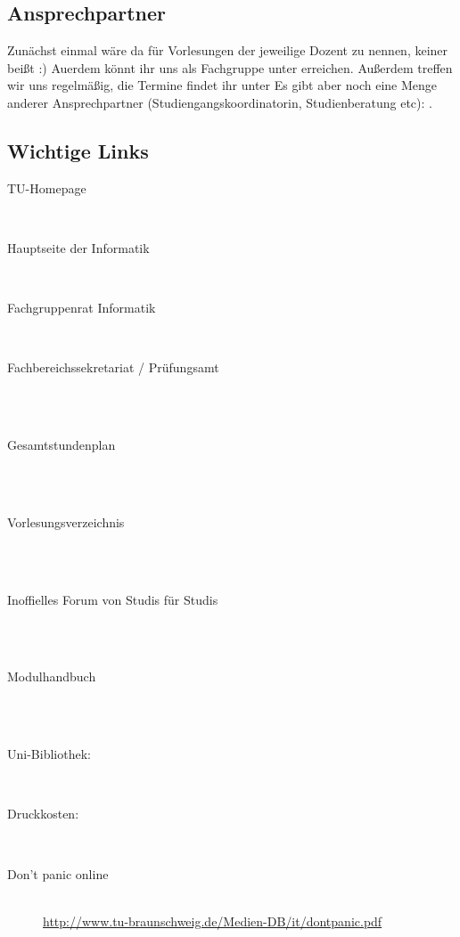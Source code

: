 \subsection*{Ansprechpartner}
Zunächst einmal wäre da für Vorlesungen der jeweilige Dozent zu nennen,
keiner beißt :) Auerdem könnt ihr uns als Fachgruppe unter
  erreichen. Außerdem treffen wir uns regelmäßig,
die Termine findet ihr unter
Es gibt aber noch eine Menge anderer Ansprechpartner
(Studiengangskoordinatorin, Studienberatung etc):
. 

\subsection*{Wichtige Links}
\begin{description}
  \item[TU-Homepage]~\\
 \item[Hauptseite der Informatik]~\\
 \item[Fachgruppenrat Informatik]~\\
 \item[Fachbereichssekretariat / Prüfungsamt]~\\
 \\
\item[Gesamtstundenplan]~\\\\
\item[Vorlesungsverzeichnis]~\\\\
\item[Inoffielles Forum von Studis für
  Studis]~\\\\
\item[Modulhandbuch]~\\\\
\item[Uni-Bibliothek:] ~\\
\item[Druckkosten:] ~\\
\item[Don't panic online] ~\\
{\footnotesize\url{http://www.tu-braunschweig.de/Medien-DB/it/dontpanic.pdf}}
\end{description}

